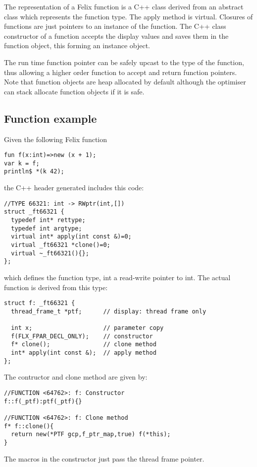 \documentclass[oneside]{book}
\begin{document}
The representation of a Felix function is a C++ class derived from an abstract class
which represents the function type. The apply method is virtual. Closures of functions
are just pointers to an instance of the function. The C++ class constructor of a function
accepts the display values and saves them in the function object, this forming
an instance object. 

The run time function pointer can be safely upcast to the type of the function,
thus allowing a higher order function to accept and return function pointers.
Note that function objects are heap allocated by default although the optimiser
can stack allocate function objects if it is safe.


\subsection{Function example}
Given the following Felix function 

\begin{verbatim}
fun f(x:int)=>new (x + 1);
var k = f;
println$ *(k 42);
\end{verbatim}

the C++ header generated includes this code:

\begin{verbatim}
//TYPE 66321: int -> RWptr(int,[])
struct _ft66321 {
  typedef int* rettype;
  typedef int argtype;
  virtual int* apply(int const &)=0;
  virtual _ft66321 *clone()=0;
  virtual ~_ft66321(){};
};
\end{verbatim}

which defines the function type, int a read-write pointer to int.
The actual function is derived from this type:

\begin{verbatim}
struct f: _ft66321 {
  thread_frame_t *ptf;      // display: thread frame only

  int x;                    // parameter copy
  f(FLX_FPAR_DECL_ONLY);    // constructor
  f* clone();               // clone method
  int* apply(int const &);  // apply method
};
\end{verbatim}

The contructor and clone method are given by:
\begin{verbatim}
//FUNCTION <64762>: f: Constructor
f::f(_ptf):ptf(_ptf){}

//FUNCTION <64762>: f: Clone method
f* f::clone(){
  return new(*PTF gcp,f_ptr_map,true) f(*this);
}
\end{verbatim}
The macros in the constructor just pass the thread frame pointer.
\end{document}
